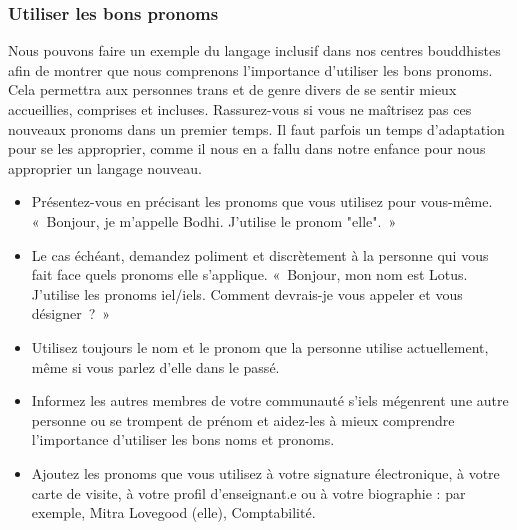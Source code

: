 \documentclass[12pt,openany]{book}
\begin{document}
\subsubsection*{Utiliser les bons pronoms}

\noindent Nous pouvons faire un exemple du langage inclusif dans nos centres bouddhistes afin de montrer que nous comprenons l’importance d’utiliser les bons pronoms. Cela permettra aux personnes trans et de genre divers de se sentir mieux accueillies, comprises et incluses.
Rassurez-vous si vous ne maîtrisez pas ces nouveaux pronoms dans un premier temps. Il faut parfois un temps d’adaptation pour se les approprier, comme il nous en a fallu dans notre enfance pour nous approprier un langage nouveau.

\begin{itemize}[label=\textbullet]
\setlength\itemsep{-0.3em}
\item Présentez-vous en précisant les pronoms que vous utilisez pour vous-même.
\mbox{« Bonjour}, je m’appelle Bodhi. J’utilise le pronom \mbox{"elle". »}
\item Le cas échéant, demandez poliment et discrètement à la personne qui vous fait face quels pronoms elle s’applique. \mbox{« Bonjour}, mon nom est Lotus. J’utilise les pronoms iel/iels. Comment devrais-je vous appeler et vous \mbox{désigner ? »}
\item Utilisez toujours le nom et le pronom que la personne utilise actuellement, même si vous parlez d’elle dans le passé.
\item Informez les autres membres de votre communauté s’iels mégenrent une autre personne ou se trompent de prénom et aidez-les à mieux comprendre l’importance d’utiliser les bons noms et pronoms.
\item Ajoutez les pronoms que vous utilisez à votre signature électronique, à votre carte de visite, à votre profil d’enseignant.e ou à votre biographie : par exemple, Mitra Lovegood (elle), Comptabilité.
\end{itemize}

\begin{figure}[h]
    \centering
\end{figure}
\end{document}
